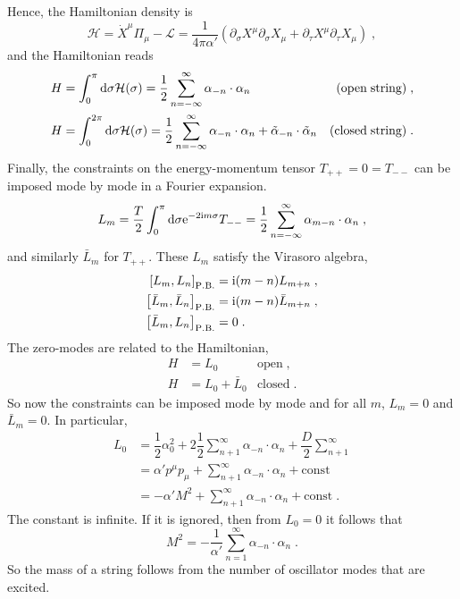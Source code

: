\documentclass[11pt]{article} %
\begin{document}
Hence, the Hamiltonian density is
\begin{equation}
	\mathcal{H} = \dot{X}^{\mu}\Pi_{\mu} - \mathcal{L} = \dfrac{1}{4\pi\alpha'}\left( \partial_{\sigma}X^{\mu}\partial_{\sigma}X_{\mu} + \partial_{\tau}X^{\mu} \partial_{\tau}X_{\mu}\right)\;,
\end{equation}
and the Hamiltonian reads
\begin{align}
	H 	&= \int_0^{\pi}\mathrm{d}\sigma\mathcal{H}(\sigma)	= \dfrac{1}{2}\sum_{n=-\infty}^{\infty}\alpha_{-n}\cdot\alpha_n 	&\mathrm{(open\; string)}\;,\\
	H 	&= \int_0^{2\pi}\mathrm{d}\sigma\mathcal{H}(\sigma)	= \dfrac{1}{2}\sum_{n=-\infty}^{\infty}\alpha_{-n}\cdot\alpha_n + \tilde{\alpha}_{-n}\cdot\tilde{\alpha}_n	&\mathrm{(closed\; string)}\;.
\end{align}
Finally, the constraints on the energy-momentum tensor $T_{++} = 0 = T_{--}$ can be imposed mode by mode in a Fourier expansion.
\begin{equation}
	L_m = \dfrac{T}{2} \int_0^{\pi} \mathrm{d}\sigma \mathrm{e}^{-2\mathrm{i} m\sigma}T_{--} = \dfrac{1}{2}\sum_{n=-\infty}^{\infty}\alpha_{m-n}\cdot\alpha_n\;,
\end{equation}
and similarly $\bar{L}_m$ for $T_{++}$. These $L_m$ satisfy the Virasoro algebra,
\begin{align}
	\left[ L_m, L_n\right]_{\mathrm{P.B.}} &= \mathrm{i} (m-n)L_{m+n}\;,\\
	\left[ \bar{L}_m, \bar{L}_n\right]_{\mathrm{P.B.}} &= \mathrm{i} (m-n)\bar{L}_{m+n}\;,\\
	\left[ \bar{L}_m, L_n\right]_{\mathrm{P.B.}} &= 0\;.
\end{align}
The zero-modes are related to the Hamiltonian,
\begin{align}
	H &= L_0 &\mathrm{open}\;,\\
	H &= L_0 + \bar{L}_0 & \mathrm{closed}\;.
\end{align}
So now the constraints can be imposed mode by mode and for all $m$, $L_m = 0$ and $\bar{L}_m=0$. In particular,
\begin{align}
	L_0 &= \dfrac{1}{2}\alpha_0^2 + 2\dfrac{1}{2}\sum_{n+1}^{\infty}\alpha_{-n}\cdot\alpha_n + \dfrac{D}{2}\sum_{n+1}^{\infty}\\
	&= \alpha'p^{\mu}p_{\mu} + \sum_{n+1}^{\infty}\alpha_{-n}\cdot\alpha_n + \mathrm{const}\\
	&= -\alpha'M^2 + \sum_{n+1}^{\infty}\alpha_{-n}\cdot\alpha_n + \mathrm{const}\;.
\end{align}	
The constant is infinite. If it is ignored, then from $L_0=0$ it follows that
\begin{equation}
	M^2 = -\dfrac{1}{\alpha'}\sum_{n=1}^{\infty}\alpha_{-n}\cdot\alpha_n\;.
\end{equation}
So the mass of a string follows from the number of oscillator modes that are excited.
\end{document}
